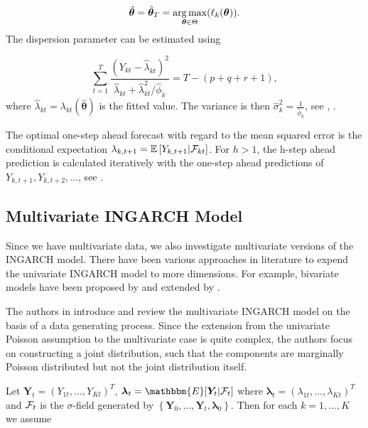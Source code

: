 \begin{equation}
\hat{\bm{\theta}}= \hat{\bm{\theta}}_T = \operatorname*{arg\,max}\limits_{\bm{\theta} \in \Theta} (\ell_k(\bm{\theta})). 
\label{eq:ingarch qmle}
\end{equation}
%
The dispersion parameter can be estimated using

\begin{equation}
\sum_{t=1}^T \frac{(Y_{kt}-\hat{\lambda}_{kt})^2}{\hat{\lambda}_{kt}+\hat{\lambda}^2_{kt}/\hat{\phi}_k} = T - (p+q+r+1),
\label{eq:Dispersion Parameter Estimation}
\end{equation}
%
where $\hat{\lambda}_{kt} = \lambda_{kt}(\hat{\bm{\theta}})$ is the fitted value. The variance is then $\hat{\sigma}_k^2=\frac{1}{\hat{\phi}_k}$, see \textcite{Fokianos:2014}, \textcite{Liboschik:2016}. 

The optimal one-step ahead forecast with regard to the mean squared error is the conditional expectation $\lambda_{k,t+1}=\mathbb{E}\left[Y_{k,t+1} | \mathcal{F}_{kt} \right]$. For $h>1$, the h-step ahead prediction is calculated iteratively with the one-step ahead predictions of $Y_{k,t+1},Y_{k,t+2},\ldots$, see \textcite{Liboschik:2016}. 

\subsection{Multivariate INGARCH Model}
\label{sec: Multivariate Ingarch}

Since we have multivariate data, we also investigate multivariate versions of the INGARCH model. There have been various approaches in literature to expend the univariate INGARCH model to more dimensions. For example, bivariate models have been proposed by \textcite{Liu:2012} and  extended by \textcite{Cui:2018}. 

The authors in \textcite{Fokianos:2020,Fokianos:2021} introduce and review the multivariate INGARCH model on the basis of a data generating process. Since the extension from the univariate Poisson assumption to the multivariate case is quite complex, the authors focus on constructing a joint distribution, such that the components are marginally Poisson distributed but not the joint distribution itself. 

Let $\bm{Y}_t=(Y_{1t},\ldots,Y_{Kt})^T$, $\bm{\lambda}_t=\mathbbm{E}[\bm{Y}_t|\SigA_t]$ where $\bm{\lambda}_t = (\lambda_{1t},\ldots,\lambda_{Kt})^T$ and $\mathcal{F}_t$ is the $\sigma$-field generated by $\left\{\bm{Y}_0,\ldots,\bm{Y}_t,\bm{\lambda}_0\right\}$. Then for each $k=1,\ldots,K$ we assume

